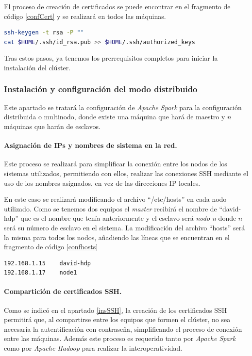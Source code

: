 El proceso de creación de certificados se puede encontrar en el fragmento de código \ref{confCert} y se realizará en todos las máquinas.

\begin{lstlisting}[label=confCert,language=sh,frame=single,caption=Creación y autorización del certificado \gls{SSH}.]
ssh-keygen -t rsa -P ""
cat $HOME/.ssh/id_rsa.pub >> $HOME/.ssh/authorized_keys
\end{lstlisting}

Tras estos pasos, ya tenemos los prerrequisitos completos para iniciar la instalación del clúster.

\clearpage
\subsubsection{Instalación y configuración del modo distribuido}
Este apartado se tratará la configuración de \textit{Apache Spark} para la configuración distribuida o multinodo, donde existe una máquina que hará de maestro y $n$ máquinas que harán de esclavos. 

\paragraph{Asignación de IPs y nombres de sistema en la red.}
Este proceso se realizará para simplificar la conexión entre los nodos de los sistemas utilizados, permitiendo con ellos, realizar las conexiones \gls{SSH} mediante el uso de los nombres asignados, en vez de las direcciones  
IP locales.

En este caso se realizará modificando el archivo ``/etc/hosts'' en cada nodo utilizado. Como se tenemos dos equipos el \textit{master} recibirá el nombre de ``david-hdp'' que es el nombre que tenía anteriormente y el esclavo será \textit{nodo n} donde $n$ será su número de esclavo en el sistema. La modificación del archivo ``hosts'' será la misma para todos los nodos, añadiendo las líneas que se encuentran en el fragmento de código \ref{confhosts}

\begin{lstlisting}[label=confhosts,language=sh,frame=single,caption=Líneas a añadir en el fichero ``/etc/hosts'' de cada nodo del clúster.]
192.168.1.15 	david-hdp
192.168.1.17	node1
\end{lstlisting}

\paragraph{Compartición de certificados \gls{SSH}.}
Como se indicó en el apartado \ref{insSSH}, la creación de los certificados \gls{SSH} permitirá que, al compartirse entre los equipos que formen el clúster, no sea necesaria la autentificación con contraseña, simplificando el proceso de conexión entre las máquinas. Además este proceso es requerido tanto por \textit{Apache Spark} como por \textit{Apache Hadoop} para realizar la interoperatividad.

